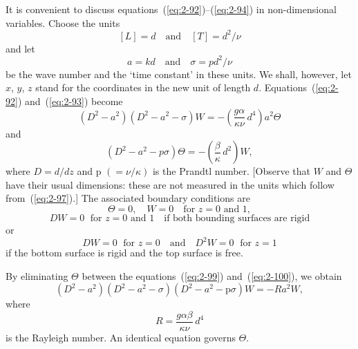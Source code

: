 It is convenient to discuss equations~(\ref{eq:2-92})--(\ref{eq:2-94}) in non-dimensional
variables. Choose the units
\begin{equation}
\label{eq:2-97}
[L] = d \quad\text{and}\quad [T] = d^2/\nu
\end{equation}
and let
\begin{equation}
\label{eq:2-98}
a = kd \quad\text{and}\quad \sigma = pd^2/\nu
\end{equation}
be the wave number and the `time constant' in these units. We shall,
however, let $x$, $y$, $z$ stand for the coordinates in the new unit of length $d$.
Equations~(\ref{eq:2-92}) and~(\ref{eq:2-93}) become
\begin{equation}
\label{eq:2-99}
(D^2 - a^2)(D^2 - a^2 - \sigma)W = -\left(\frac{g\alpha}{\kappa\nu}\,d^4\right)a^2\Theta
\end{equation}
and
\begin{equation}
\label{eq:2-100}
(D^2 - a^2 - p\sigma)\Theta = -\left(\frac{\beta}{\kappa}\,d^2\right)W,
\end{equation}
where $D = d/dz$ and $\mathrm{p}$ $(= \nu/\kappa)$ is the Prandtl number. [Observe that
$W$ and $\Theta$ have their usual dimensions: these are not measured in the
units which follow from~(\ref{eq:2-97}).] The associated boundary conditions are
\begin{equation}
\label{eq:2-101}
\Theta = 0, \quad W = 0 \quad\text{for } z = 0 \text{ and } 1,
\end{equation}
\begin{equation}
\label{eq:2-102}
DW = 0 \;\text{ for } z = 0 \text{ and } 1 \quad\text{if both bounding surfaces are rigid}
\end{equation}
or
\begin{equation}
\label{eq:2-103}
DW = 0 \;\text{ for } z = 0 \quad\text{and}\quad D^2W = 0 \;\text{ for } z = 1
\end{equation}
if the bottom surface is rigid and the top surface is free.

By eliminating $\Theta$ between the equations~(\ref{eq:2-99}) and~(\ref{eq:2-100}), we obtain
\begin{equation}
\label{eq:2-104}
(D^2-a^2)(D^2-a^2-\sigma)(D^2-a^2-\mathrm{p}\sigma)W = -Ra^2 W,
\end{equation}
where
\begin{equation}
\label{eq:2-105}
R = \frac{g\alpha\beta}{\kappa\nu}\,d^4
\end{equation}
is the Rayleigh number. An identical equation governs $\Theta$.

